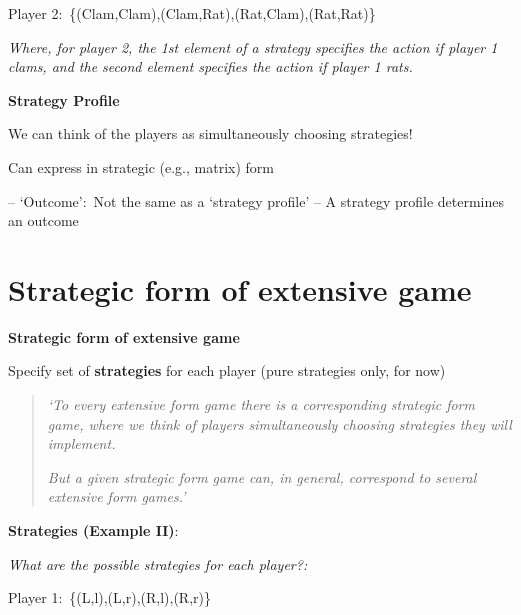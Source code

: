 Player 2:\ \{(Clam,Clam),(Clam,Rat),(Rat,Clam),(Rat,Rat)\}\

\textit{Where, for player 2, the 1st element of a strategy specifies the
action if player 1 clams, and the second element specifies the action if
player 1 rats.}



\textbf{Strategy Profile }

We can think of the players as simultaneously choosing strategies!

Can express in strategic (e.g., matrix) form

-- `Outcome':\ Not the same as a `strategy profile' -- A strategy profile
determines an outcome


\section{Strategic form of extensive game}

\textbf{Strategic form of extensive game}

Specify set of \textbf{strategies} for each player (pure strategies only,
for now)


\begin{quote}
\textit{`To every extensive form game there is a corresponding strategic
form game, where we think of players simultaneously choosing strategies they
will implement. }


\textit{But a given strategic form game can, in general, correspond to
several extensive form games.'\bigskip }
\end{quote}



\textbf{Strategies (Example II)}:


\bigskip

\textit{What are the possible strategies for each player?:}

\bigskip


\bigskip

Player 1:\ \{(L,l),(L,r),(R,l),(R,r)\}

